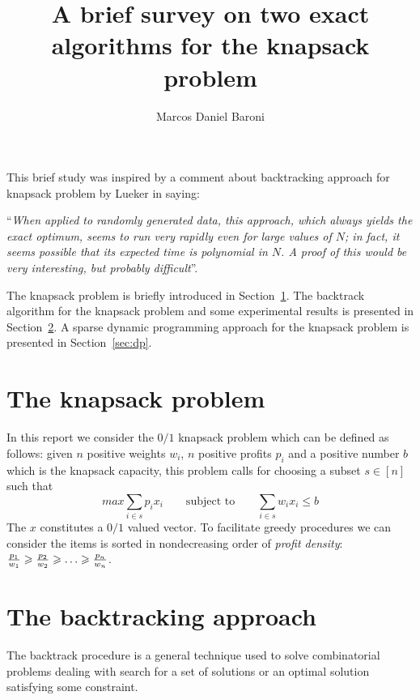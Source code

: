 \documentclass{article}
\title{A brief survey on two exact algorithms for the knapsack problem}
\author{Marcos Daniel Baroni}
\begin{document}
\maketitle

This brief study was inspired by a comment about backtracking approach for knapsack problem
by Lueker in \cite{lueker1982average} 
saying:

\vspace*{10pt}
\begin{minipage}{5in}
``{\it When applied to randomly generated data, this approach, which always yields the
exact optimum, seems to run very rapidly even for large values of $N$; in fact,
it seems possible that its expected time is polynomial in $N$. A proof of this
would be very interesting, but probably difficult}''.
\end{minipage}
\vspace*{10pt}

The knapsack problem is briefly introduced in Section~\ref{sec:kp}.
The backtrack algorithm for the knapsack problem and some experimental results
is presented in Section~\ref{sec:backtrack}.
A sparse dynamic programming approach for the knapsack problem is presented in
Section~\ref{sec:dp}.

\section{The knapsack problem}
\label{sec:kp}

In this report we consider the $0/1$ knapsack problem which can be defined as follows:
given $n$ positive weights $w_i$, $n$ positive profits $p_i$ and a positive
number $b$ which is the knapsack capacity, this problem calls for choosing a
subset $s \in [n]$ such that
\begin{displaymath}
  max \sum_{i \in s} p_i x_i \qquad \text{subject to} \qquad
  \sum_{i \in s} w_i x_i \leqslant b
\end{displaymath}
The $x$ constitutes a $0/1$ valued vector.
To facilitate greedy procedures we can consider the items is sorted in
nondecreasing order of {\it profit density}:
  ${p_1 \over w_1} \geqslant {p_2 \over w_2} \geqslant \ldots \geqslant {p_n \over w_n}$.

\section{The backtracking approach}
\label{sec:backtrack}
The backtrack procedure is a general technique used to solve combinatorial
problems dealing with search for a set of solutions or an optimal
solution satisfying some constraint.
\end{document}

